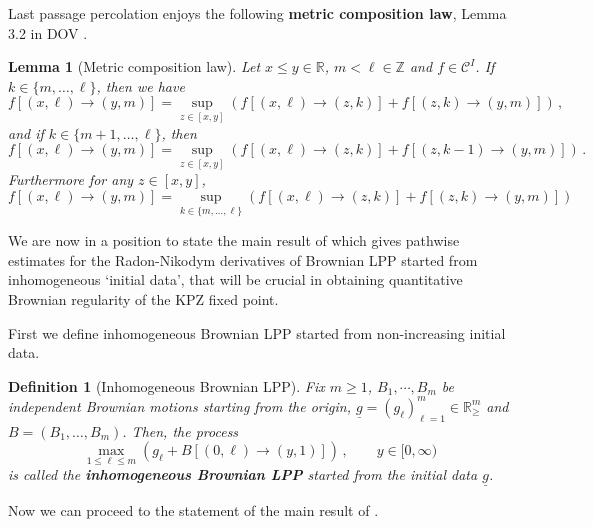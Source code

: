 \documentclass[11pt, reqno]{amsart}
\numberwithin{equation}{section}
\newcounter{dummy} \numberwithin{dummy}{section}
\newtheorem{definition}[dummy]{Definition}
\newtheorem{lemma}[dummy]{Lemma}
\newcommand{\R}{\ensuremath{\mathbb{R}}}
\begin{document}
Last passage percolation enjoys the following \textbf{metric composition law}, Lemma 3.2 in DOV \cite{DOV}.

\begin{lemma}[Metric composition law]\label{Lemma: Metric Composition}
    Let \(x\leq y \in \mathbb{R}\), \(m < \ell\in\mathbb{Z}\) and \(f\in \mathscr{C}^I\). If \(k\in \{m, \dots, \ell\}\), then we have
    \begin{equation*}
    f[(x,\ell)\to(y,m)] = \displaystyle \sup_{z\in[x,y]}(f[(x,\ell)\to(z,k)]+f[(z,k)\to(y,m)])\,,
    \end{equation*}
    and if \(k\in \{m+1, \dots, \ell\}\), then 
    \begin{equation*}
    f[(x,\ell)\to(y,m)] = \displaystyle \sup_{z\in[x,y]}(f[(x,\ell)\to(z,k)]+f[(z,k-1)\to(y,m)])\,.
    \end{equation*}
    Furthermore for any \(z\in [x,y]\), 
    \begin{equation}\label{eq: composition}
    f[(x,\ell)\to(y,m)] = \displaystyle \sup_{k\in \{m, \dots, \ell\}}(f[(x,\ell)\to(z,k)]+f[(z,k)\to(y,m)])
    \end{equation}
\end{lemma}%

We are now in a position to state the main result of \cite{tassopoulos2025inhomogeneousbrownian} which gives pathwise estimates for the Radon-Nikodym derivatives of Brownian LPP started from inhomogeneous `initial data', that will be crucial in obtaining quantitative Brownian regularity of the KPZ fixed point.

First we define inhomogeneous Brownian LPP started from non-increasing initial data.

\begin{definition}[Inhomogeneous Brownian LPP]\label{def: inhom brownian lpp}
    Fix $m\ge 1$, $B_1, \cdots, B_m$ be independent Brownian motions starting from the origin, $\underline{g} = (g_\ell)_{\ell =1}^m \in\R^m_{\ge}$ and $B=(B_1,
    \ldots,B_m)$. Then, the process 
     \begin{equation*}
     \displaystyle\max_{1\le \ell \le m}(g_{\ell} + B[(0,\ell)\to (y, 1)])\,, \qquad  y\in [0,\infty)
     \end{equation*}
     is called the \textbf{inhomogeneous Brownian LPP} started from the initial data $\underline{g}$.
\end{definition}

Now we can proceed to the statement of the main result of \cite{tassopoulos2025inhomogeneousbrownian}.
\end{document}
